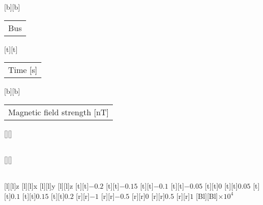 %
%
[b][b]{\fontsize{8}{12}\selectfont \setlength{\tabcolsep}{0pt}\begin{tabular}{c}Bus\end{tabular}}%
[t][t]{\fontsize{8}{12}\selectfont \setlength{\tabcolsep}{0pt}\begin{tabular}{c}Time [s]\end{tabular}}%
[b][b]{\fontsize{8}{12}\selectfont \setlength{\tabcolsep}{0pt}\begin{tabular}{c}Magnetic field strength [nT]\end{tabular}}%
[][]{\fontsize{10}{15}\selectfont \setlength{\tabcolsep}{0pt}\begin{tabular}{c} \end{tabular}}%
[][]{\fontsize{10}{15}\selectfont \setlength{\tabcolsep}{0pt}\begin{tabular}{c} \end{tabular}}%
[l][l]{\fontsize{6}{15}\selectfont z}%
[l][l]{\fontsize{6}{15}\selectfont x}%
[l][l]{\fontsize{6}{15}\selectfont y}%
[l][l]{\fontsize{6}{15}\selectfont z}%
%
\fontsize{6}{15}%
\selectfont%
%
[t][t]{$-0.2$}%
[t][t]{$-0.15$}%
[t][t]{$-0.1$}%
[t][t]{$-0.05$}%
[t][t]{$0$}%
[t][t]{$0.05$}%
[t][t]{$0.1$}%
[t][t]{$0.15$}%
[t][t]{$0.2$}%
%
[r][r]{$-1$}%
[r][r]{$-0.5$}%
[r][r]{$0$}%
[r][r]{$0.5$}%
[r][r]{$1$}%
[Bl][Bl]{$\times 10^{4}$}%
%
%
